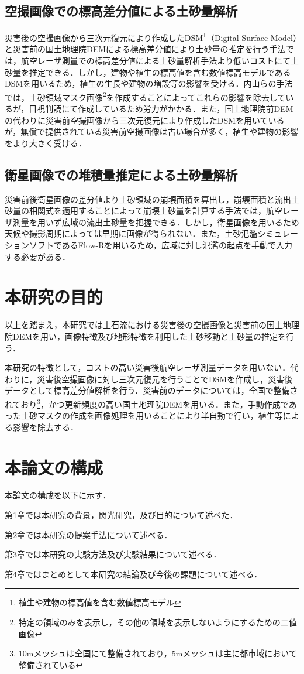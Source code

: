     \subsection*{空撮画像での標高差分値による土砂量解析}
      災害後の空撮画像から三次元復元により作成したDSM\footnote{植生や建物の標高値を含む数値標高モデル}（Digital Surface Model）と災害前の国土地理院DEM\cite{基盤地図情報}による標高差分値により土砂量の推定を行う手法\cite{土砂量解析3}では，航空レーザ測量での標高差分値による土砂量解析手法より低いコストにて土砂量を推定できる．しかし，建物や植生の標高値を含む数値標高モデルであるDSMを用いるため，植生の生長や建物の増設等の影響を受ける．内山らの手法\cite{土砂量解析4}では，土砂領域マスク画像\footnote{特定の領域のみを表示し，その他の領域を表示しないようにするための二値画像}を作成することによってこれらの影響を除去しているが，目視判読にて作成しているため労力がかかる．また，国土地理院前DEMの代わりに災害前空撮画像から三次元復元により作成したDSMを用いているが，無償で提供されている災害前空撮画像は古い場合が多く，植生や建物の影響をより大きく受ける．


    \subsection*{衛星画像での堆積量推定による土砂量解析}
      災害前後衛星画像の差分値より土砂領域の崩壊面積を算出し，崩壊面積と流出土砂量の相関式を適用することによって崩壊土砂量を計算する手法\cite{土砂量解析5}では，航空レーザ測量を用いず広域の流出土砂量を把握できる．しかし，衛星画像を用いるため天候や撮影周期によっては早期に画像が得られない．また，土砂氾濫シミュレーションソフトであるFlow-R\cite{Flow-R}を用いるため，広域に対し氾濫の起点を手動で入力する必要がある．



  \section{本研究の目的}
    以上を踏まえ，本研究では土石流における災害後の空撮画像と災害前の国土地理院DEMを用い，画像特徴及び地形特徴を利用した土砂移動と土砂量の推定を行う．
    
    本研究の特徴として，コストの高い災害後航空レーザ測量データを用いない．代わりに，災害後空撮画像に対し三次元復元を行うことでDSMを作成し，災害後データとして標高差分値解析を行う．災害前のデータについては，全国で整備されており\footnote{10mメッシュは全国にて整備されており，5mメッシュは主に都市域において整備されている}，かつ更新頻度の高い国土地理院DEMを用いる．また，手動作成であった土砂マスクの作成を画像処理を用いることにより半自動で行い，植生等による影響を除去する．



  \section{本論文の構成}
    本論文の構成を以下に示す．
    
    第1章では本研究の背景，閃光研究，及び目的について述べた．

    第2章では本研究の提案手法について述べる．

    第3章では本研究の実験方法及び実験結果について述べる．

    第4章ではまとめとして本研究の結論及び今後の課題について述べる．
